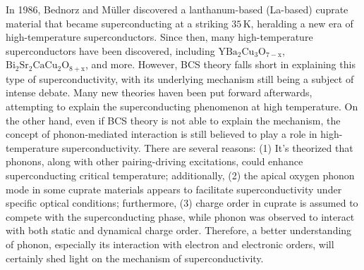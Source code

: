 \documentclass[11pt]{article}
\begin{document}
In 1986, Bednorz and Müller discovered a lanthanum-based (La-based) cuprate material that became superconducting at a striking $35\,\mathrm{K}$\cite{bednorz_possible_1986}, heralding a new era of high-temperature superconductors. Since then, many  high-temperature superconductors have been discovered, including $\mathrm{YBa_{2}Cu_{3}O_{7-x}}$\cite{wu_superconductivity_1987}, $\mathrm{Bi_2Sr_2CaCu_{2}O_{8+x}}$\cite{maeda_a_1988}, and more. However, BCS theory falls short in explaining this type of superconductivity, with its underlying mechanism still being a subject of intense debate. Many new theories haven been put forward afterwards, attempting to explain the superconducting phenomenon at high temperature. On the other hand, even if BCS theory is not able to explain the mechanism, the concept of phonon-mediated interaction is still believed to play a role in high-temperature superconductivity. There are several reasons: (1) It's theorized that phonons, along with other pairing-driving excitations, could enhance superconducting critical temperature\cite{braicovich_determining_2020}; additionally, (2) the apical oxygen phonon mode in some cuprate materials appears to facilitate superconductivity under specific optical conditions\cite{kaiser_optically_2014}; furthermore, (3) charge order in cuprate is assumed to compete with the superconducting phase, while phonon was observed to interact with both static and dynamical charge order\cite{arpaia_charge_2021,comin_resonant_2016,canosa_resonant_2014, hucker_competing_2014, chang_direct_2012,ghiringhelli_long-range_2012,wang_charge_2021,lin_strongly_2020, huang_quantum_2021,miao_incommensurate_2018,tacon_inelastic_2014,li_multiorbital_2020,braicovich_determining_2020,chaix_dispersive_2017,peng_enhanced_2020}. Therefore, a better understanding of phonon, especially its interaction with electron and electronic orders, will certainly shed light on the mechanism of superconductivity.  
\end{document}
